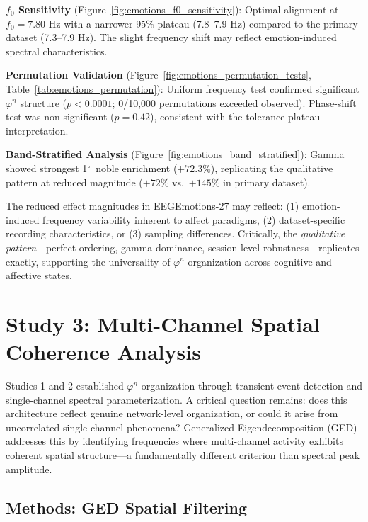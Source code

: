 \documentclass[11pt,a4paper]{article}
\newcommand{\degree}{$^\circ$}  %
\newcommand{\phisym}{\varphi}
\begin{document}
\textbf{$f_0$ Sensitivity} (Figure~\ref{fig:emotions_f0_sensitivity}): Optimal alignment at $f_0 = 7.80$ Hz with a narrower 95\% plateau (7.8--7.9 Hz) compared to the primary dataset (7.3--7.9 Hz). The slight frequency shift may reflect emotion-induced spectral characteristics.

\textbf{Permutation Validation} (Figure~\ref{fig:emotions_permutation_tests}, Table~\ref{tab:emotions_permutation}): Uniform frequency test confirmed significant $\phisym^n$ structure ($p < 0.0001$; 0/10,000 permutations exceeded observed). Phase-shift test was non-significant ($p = 0.42$), consistent with the tolerance plateau interpretation.

\textbf{Band-Stratified Analysis} (Figure~\ref{fig:emotions_band_stratified}): Gamma showed strongest 1\degree\ noble enrichment ($+72.3\%$), replicating the qualitative pattern at reduced magnitude ($+72\%$ vs.\ $+145\%$ in primary dataset).

The reduced effect magnitudes in EEGEmotions-27 may reflect: (1) emotion-induced frequency variability inherent to affect paradigms, (2) dataset-specific recording characteristics, or (3) sampling differences. Critically, the \textit{qualitative pattern}---perfect ordering, gamma dominance, session-level robustness---replicates exactly, supporting the universality of $\phisym^n$ organization across cognitive and affective states.

\section{Study 3: Multi-Channel Spatial Coherence Analysis}

Studies 1 and 2 established $\phisym^n$ organization through transient event detection and single-channel spectral parameterization. A critical question remains: does this architecture reflect genuine network-level organization, or could it arise from uncorrelated single-channel phenomena? Generalized Eigendecomposition (GED) addresses this by identifying frequencies where multi-channel activity exhibits coherent spatial structure---a fundamentally different criterion than spectral peak amplitude.

\subsection{Methods: GED Spatial Filtering}
\end{document}
